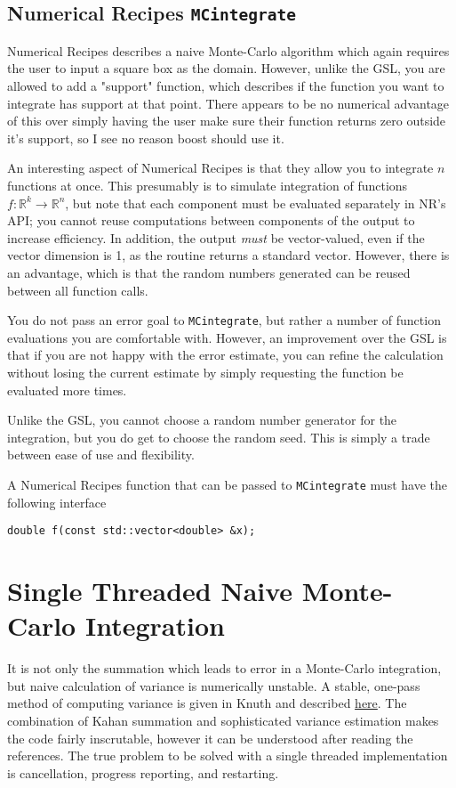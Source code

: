 \documentclass[landscape]{article}
\numberwithin{equation}{section}
\begin{document}
\subsection{Numerical Recipes \texttt{MCintegrate}}

Numerical Recipes describes a naive Monte-Carlo algorithm which again requires the user to input a square box as the domain.
However, unlike the GSL, you are allowed to add a "support" function, which describes if the function you want to integrate has support at that point.
There appears to be no numerical advantage of this over simply having the user make sure their function returns zero outside it's support, so I see no reason boost should use it.

An interesting aspect of Numerical Recipes is that they allow you to integrate $n$ functions at once.
This presumably is to simulate integration of functions $f\colon \mathbb{R}^{k} \to \mathbb{R}^{n}$, but note that each component must be evaluated separately in NR's API; you cannot reuse computations between components of the output to increase efficiency.
In addition, the output \emph{must} be vector-valued, even if the vector dimension is 1, as the routine returns a standard vector.
However, there is an advantage, which is that the random numbers generated can be reused between all function calls.

You do not pass an error goal to \texttt{MCintegrate}, but rather a number of function evaluations you are comfortable with.
However, an improvement over the GSL is that if you are not happy with the error estimate, you can refine the calculation without losing the current estimate by simply requesting the function be evaluated more times.

Unlike the GSL, you cannot choose a random number generator for the integration, but you do get to choose the random seed.
This is simply a trade between ease of use and flexibility.

A Numerical Recipes function that can be passed to \texttt{MCintegrate} must have the following interface
\begin{verbatim}
double f(const std::vector<double> &x);
\end{verbatim}


\section{Single Threaded Naive Monte-Carlo Integration}

It is not only the summation which leads to error in a Monte-Carlo integration, but naive calculation of variance is numerically unstable.
A stable, one-pass method of computing variance is given in Knuth and described \href{https://www.johndcook.com/blog/standard_deviation/}{here}.
The combination of Kahan summation and sophisticated variance estimation makes the code fairly inscrutable, however it can be understood after reading the references.
The true problem to be solved with a single threaded implementation is cancellation, progress reporting, and restarting.
\end{document}
